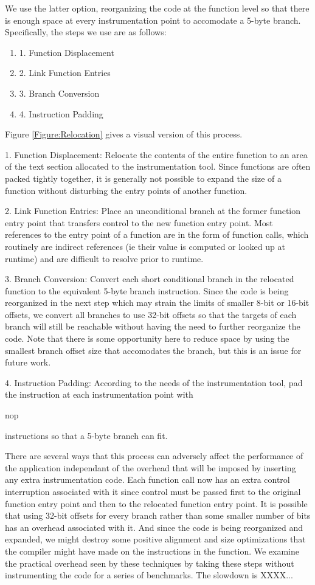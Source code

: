 We use the latter option, reorganizing the code at the function level so that there is enough space at every instrumentation
point to accomodate a 5-byte branch. Specifically, the steps we use are as follows:
\begin{enumerate}
\item 
1. Function Displacement
\item
2. Link Function Entries 
\item
3. Branch Conversion
\item
4. Instruction Padding
\end{enumerate}


Figure \ref{Figure:Relocation} gives a visual version of this process.

1. Function Displacement: Relocate the contents of the entire function to an area of the text section allocated
to the instrumentation tool. Since functions are often packed tightly together, it is generally not possible to
expand the size of a function without disturbing the entry points of another function.

2. Link Function Entries: Place an unconditional branch at the former function entry point that transfers control
to the new function entry point. Most references to the entry point of a function are in the form of function calls, which
routinely are indirect references (ie their value is computed or looked up at runtime) and are difficult to resolve
prior to runtime.

3. Branch Conversion: Convert each short conditional branch in the relocated function to the equivalent
5-byte branch instruction. Since the code is being reorganized in the next step which may strain the limits of
smaller 8-bit or 16-bit offsets, we convert all branches to use 32-bit offsets so that the targets of each branch
will still be reachable without having the need to further reorganize the code. Note that there is some opportunity
here to reduce space by using the smallest branch offset size that accomodates the branch, but this is an issue
for future work.

4. Instruction Padding: According to the needs of the instrumentation tool, pad the instruction at each instrumentation
point with \begin{it}nop\end{it} instructions so that a 5-byte branch can fit.

There are several ways that this process can adversely affect the performance of the application independant of the overhead
that will be imposed by inserting any extra instrumentation code. Each function call
now has an extra control interruption associated with it since control must be passed first to the original function entry
point and then to the relocated function entry point. It is possible that using 32-bit offsets for every branch rather than
some smaller number of bits has an overhead associated with it. And since the code is being reorganized and expanded, 
we might destroy some positive alignment and size optimizations that the compiler might have made on the instructions in the
function. We examine the practical overhead seen by these techniques by taking these steps without instrumenting the code
for a series of benchmarks. The slowdown is XXXX...
